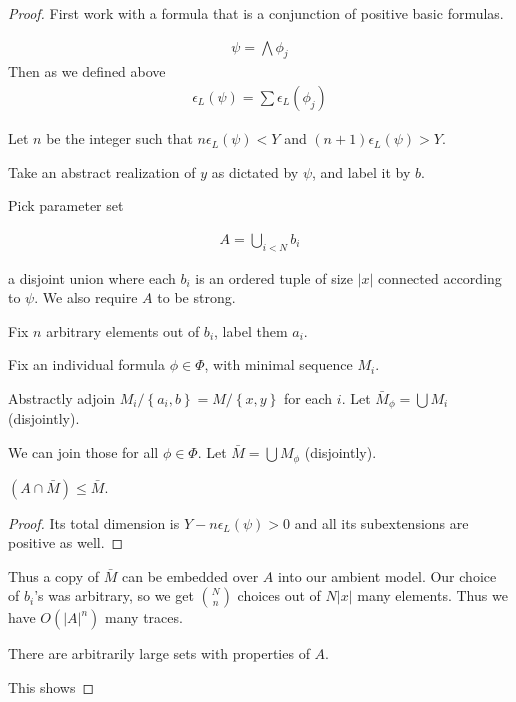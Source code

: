 \documentclass{amsart}
\newcommand{\curly}[1]{\left\{#1\right\}}
\begin{document}
\begin{proof}
	First work with a formula that is a conjunction of positive basic formulas.

	\begin{align*}
		\psi = \bigwedge \phi_j
	\end{align*}
	Then as we defined above
	\begin{align*}
		\epsilon_L(\psi) = \sum \epsilon_L(\phi_j)
	\end{align*}

	Let $n$ be the integer such that $n \epsilon_L(\psi) < Y$ and $(n+1) \epsilon_L(\psi) > Y$.

	Take an abstract realization of $y$ as dictated by $\psi$, and label it by $b$.

	Pick parameter set 

	\begin{align*}
		A = \bigcup_{i<N} b_i
	\end{align*}

	a disjoint union where each $b_i$ is an ordered tuple of size $|x|$ connected according to $\psi$.
	We also require $A$ to be strong.

	Fix $n$ arbitrary elements out of $b_i$, label them $a_i$.

	Fix an individual formula $\phi \in \Phi$, with minimal sequence $M_i$.

	Abstractly adjoin $M_i/\curly{a_i, b} = M/\curly{x,y}$ for each $i$.
	Let $\bar M_\phi = \bigcup M_i$ (disjointly).

	We can join those for all $\phi \in \Phi$.
	Let $\bar M = \bigcup M_\phi$ (disjointly).

	\begin{Claim}
		$(A \cap \bar M) \leq \bar M$.
	\end{Claim}
	\begin{proof}
		Its total dimension is $Y - n\epsilon_L(\psi) > 0$ and all its subextensions are positive as well.
	\end{proof}

	Thus a copy of $\bar M$ can be embedded over $A$ into our ambient model.
	Our choice of $b_i$'s was arbitrary, so we get ${N \choose n}$ choices out of $N|x|$ many elements.
	Thus we have $O(|A|^n)$ many traces.

	\begin{Lemma}
		There are arbitrarily large sets with properties of $A$.
	\end{Lemma}

	This shows


\end{proof}
\end{document}
